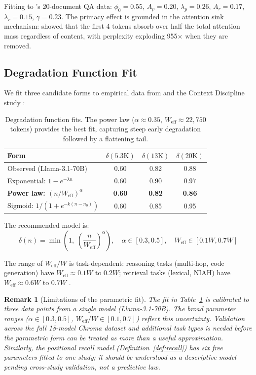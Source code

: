 \documentclass[11pt, a4paper, copyright]{googledeepmind}
\newtheorem*{remark}{Remark}
\begin{document}
Fitting to \citet{liu2024lost}'s 20-document QA data: $\phi_0 = 0.55$, $A_p = 0.20$, $\lambda_p = 0.26$, $A_r = 0.17$, $\lambda_r = 0.15$, $\gamma = 0.23$. The primacy effect is grounded in the attention sink mechanism: \citet{xiao2024efficient} showed that the first 4 tokens absorb over half the total attention mass regardless of content, with perplexity exploding 955$\times$ when they are removed.

\subsection{Degradation Function Fit}

We fit three candidate forms to empirical data from \citet{du2025context} and the Context Discipline study \citep{contextdiscipline2025}:

\begin{table}[h]
\centering
\small
\begin{tabular}{lccc}
\toprule
\textbf{Form} & \textbf{$\delta(5.3\text{K})$} & \textbf{$\delta(13\text{K})$} & \textbf{$\delta(20\text{K})$} \\
\midrule
Observed (Llama-3.1-70B) & 0.60 & 0.82 & 0.88 \\
Exponential: $1 - e^{-\lambda n}$ & 0.60 & 0.90 & 0.97 \\
\textbf{Power law: $(n/W_{\text{eff}})^\alpha$} & \textbf{0.60} & \textbf{0.82} & \textbf{0.86} \\
Sigmoid: $1/(1+e^{-k(n-n_0)})$ & 0.60 & 0.85 & 0.95 \\
\bottomrule
\end{tabular}
\caption{Degradation function fits. The power law ($\alpha \approx 0.35$, $W_{\text{eff}} \approx 22{,}750$ tokens) provides the best fit, capturing steep early degradation followed by a flattening tail.}
\label{tab:degradation-fit}
\end{table}

The recommended model is:
$$\delta(n) = \min\!\left(1, \;\left(\frac{n}{W_{\text{eff}}}\right)^{\!\alpha}\right), \quad \alpha \in [0.3, 0.5], \quad W_{\text{eff}} \in [0.1W, 0.7W]$$

The range of $W_{\text{eff}}/W$ is task-dependent: reasoning tasks (multi-hop, code generation) have $W_{\text{eff}} \approx 0.1W$ to $0.2W$; retrieval tasks (lexical, NIAH) have $W_{\text{eff}} \approx 0.6W$ to $0.7W$ \citep{kuratov2024babilong, hsieh2024ruler}.

\begin{remark}[Limitations of the parametric fit]
The fit in Table~\ref{tab:degradation-fit} is calibrated to three data points from a single model (Llama-3.1-70B). The broad parameter ranges ($\alpha \in [0.3, 0.5]$, $W_{\text{eff}}/W \in [0.1, 0.7]$) reflect this uncertainty. Validation across the full 18-model Chroma dataset and additional task types is needed before the parametric form can be treated as more than a useful approximation. Similarly, the positional recall model (Definition~\ref{def:recall}) has six free parameters fitted to one study; it should be understood as a descriptive model pending cross-study validation, not a predictive law.
\end{remark}
\end{document}
